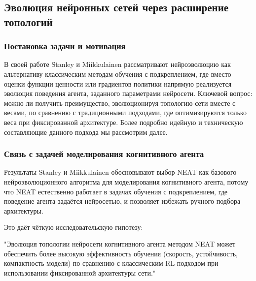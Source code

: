\subsection{Эволюция нейронных сетей через расширение топологий}

\subsubsection{Постановка задачи и мотивация}

В своей работе \cite{stanley2002neuroevolution} Stanley и Miikkulainen рассматривают нейроэволюцию как альтернативу классическим методам обучения с подкреплением, где вместо оценки функции ценности или градиентов политики напрямую реализуется эволюция поведения агента, заданного параметрами нейросети.
Ключевой вопрос: можно ли получить преимущество, эволюционируя топологию сети вместе с весами, по сравнению с традиционными подходами, где оптимизируются только веса при фиксированной архитектуре. Более подробно идейную и техническую составляющие данного подхода мы рассмотрим далее.


\subsubsection{Связь с задачей моделирования когнитивного агента}

Результаты Stanley и Miikkulainen \cite{stanley2002neuroevolution} обосновывают выбор NEAT как базового нейроэволюционного алгоритма для моделирования когнитивного агента, потому что NEAT естественно работает в задачах обучения с подкреплением, где поведение агента задаётся нейросетью, и позволяет избежать ручного подбора архитектуры.

Это даёт чёткую исследовательскую гипотезу:
  
"Эволюция топологии нейросети когнитивного агента методом NEAT может обеспечить более высокую эффективность обучения (скорость, устойчивость, компактность модели) по сравнению с классическим RL-подходом при использовании фиксированной архитектуры сети."
